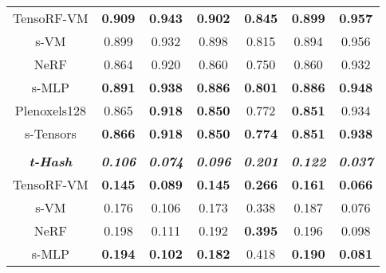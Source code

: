 \documentclass[letterpaper]{article} \usepackage{aaai23}  \usepackage{times}  \usepackage{helvet}  \usepackage{courier}  \usepackage[hyphens]{url}  \usepackage{graphicx} \urlstyle{rm} \def\UrlFont{\rm}  \usepackage{natbib}  \usepackage{caption} \frenchspacing  \setlength{\pdfpagewidth}{8.5in}  \setlength{\pdfpageheight}{11in}  \usepackage{multirow}
\begin{document}
\begin{table*}[t]
{\begin{tabular}{c|cccccc}
TensoRF-VM               & \textbf{0.909}          & \textbf{0.943}          & \textbf{0.902}          & \textbf{0.845}          & \textbf{0.899}          & \textbf{0.957}          \\
s-VM                     & 0.899                   & 0.932                   & 0.898                   & 0.815                   & 0.894                   & 0.956                   \\
NeRF                     & 0.864                   & 0.920                   & 0.860                   & 0.750                   & 0.860                   & 0.932                   \\
s-MLP                    & \textbf{0.891}          & \textbf{0.938}          & \textbf{0.886}          & \textbf{0.801}          & \textbf{0.886}          & \textbf{0.948}          \\
Plenoxels128             & 0.865                   & \textbf{0.918}          & \textbf{0.850}          & 0.772                   & \textbf{0.851}          & 0.934                   \\
s-Tensors                & \textbf{0.866}          & \textbf{0.918}          & \textbf{0.850}          & \textbf{0.774}          & \textbf{0.851}          & \textbf{0.938}          \\ \hline
                         & \multicolumn{6}{c}{}                                                                                                                            \\ \hline
\textit{\textbf{t-Hash}} & \textit{\textbf{0.106}} & \textit{\textbf{0.074}} & \textit{\textbf{0.096}} & \textit{\textbf{0.201}} & \textit{\textbf{0.122}} & \textit{\textbf{0.037}} \\
TensoRF-VM               & \textbf{0.145}          & \textbf{0.089}          & \textbf{0.145}          & \textbf{0.266}          & \textbf{0.161}          & \textbf{0.066}          \\
s-VM                     & 0.176                   & 0.106                   & 0.173                   & 0.338                   & 0.187                   & 0.076                   \\
NeRF                     & 0.198                   & 0.111                   & 0.192                   & \textbf{0.395}          & 0.196                   & 0.098                   \\
s-MLP                    & \textbf{0.194}          & \textbf{0.102}          & \textbf{0.182}          & 0.418                   & \textbf{0.190}          & \textbf{0.081}          \\

\end{tabular}}
\end{table*}
\end{document}
